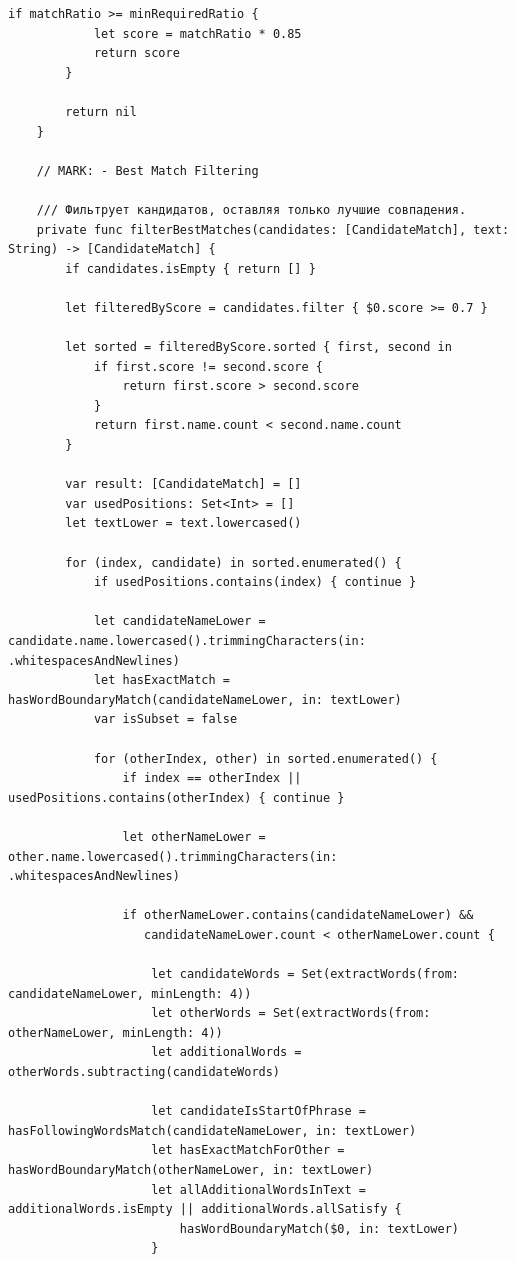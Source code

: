 \begin{lstlisting}[basicstyle=\tiny\ttfamily,breaklines=true]
        if matchRatio >= minRequiredRatio {
            let score = matchRatio * 0.85
            return score
        }

        return nil
    }

    // MARK: - Best Match Filtering

    /// Фильтрует кандидатов, оставляя только лучшие совпадения.
    private func filterBestMatches(candidates: [CandidateMatch], text: String) -> [CandidateMatch] {
        if candidates.isEmpty { return [] }

        let filteredByScore = candidates.filter { $0.score >= 0.7 }

        let sorted = filteredByScore.sorted { first, second in
            if first.score != second.score {
                return first.score > second.score
            }
            return first.name.count < second.name.count
        }

        var result: [CandidateMatch] = []
        var usedPositions: Set<Int> = []
        let textLower = text.lowercased()

        for (index, candidate) in sorted.enumerated() {
            if usedPositions.contains(index) { continue }

            let candidateNameLower = candidate.name.lowercased().trimmingCharacters(in: .whitespacesAndNewlines)
            let hasExactMatch = hasWordBoundaryMatch(candidateNameLower, in: textLower)
            var isSubset = false

            for (otherIndex, other) in sorted.enumerated() {
                if index == otherIndex || usedPositions.contains(otherIndex) { continue }

                let otherNameLower = other.name.lowercased().trimmingCharacters(in: .whitespacesAndNewlines)

                if otherNameLower.contains(candidateNameLower) &&
                   candidateNameLower.count < otherNameLower.count {

                    let candidateWords = Set(extractWords(from: candidateNameLower, minLength: 4))
                    let otherWords = Set(extractWords(from: otherNameLower, minLength: 4))
                    let additionalWords = otherWords.subtracting(candidateWords)

                    let candidateIsStartOfPhrase = hasFollowingWordsMatch(candidateNameLower, in: textLower)
                    let hasExactMatchForOther = hasWordBoundaryMatch(otherNameLower, in: textLower)
                    let allAdditionalWordsInText = additionalWords.isEmpty || additionalWords.allSatisfy {
                        hasWordBoundaryMatch($0, in: textLower)
                    }


\end{lstlisting}
